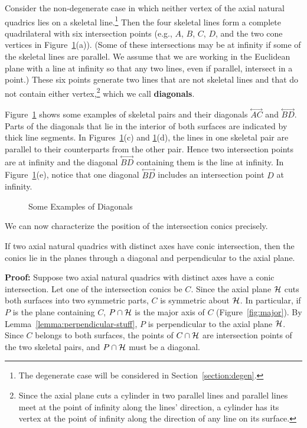 \begin{definition}
     Consider the non-degenerate case in which neither vertex of the axial
natural quadrics lies on a skeletal line.\footnote{The degenerate case will
     be considered in Section~\ref{section:degen}.}
Then the four skeletal lines
form a  complete quadrilateral with six intersection points
(e.g., $A$, $B$, $C$, $D$, and the two cone vertices in
Figure~\ref{fig:diagonals}(a)).
(Some of these intersections may be at infinity if some of the skeletal
lines are parallel.  We assume that we are working in the Euclidean plane
with a line at infinity
so that any two lines, even if parallel, intersect in a point.)
These six points generate two lines that are not skeletal lines
and that do not contain either vertex,\footnote{Since the axial plane
     cuts a cylinder in two parallel lines
     and parallel lines meet at the point of infinity along the lines'
     direction,
     a cylinder has its vertex at the point of infinity along the
     direction of any line on its surface.}
which we call {\bf diagonals}.
\end{definition}

\begin{example}
Figure~\ref{fig:diagonals} shows some examples of
skeletal pairs and their diagonals $\stackrel{\longleftrightarrow}{AC}$
and $\stackrel{\longleftrightarrow}{BD}$.
Parts of the diagonals that lie in the
interior of both surfaces are indicated by thick line segments.
In Figures~\ref{fig:diagonals}(c) and \ref{fig:diagonals}(d),
the lines in one skeletal pair are
parallel to their counterparts from the other pair.  Hence two intersection
points are at infinity and the diagonal $\stackrel{\longleftrightarrow}{BD}$
containing them is the line at
infinity.  In Figure~\ref{fig:diagonals}(e), notice that one diagonal
$\stackrel{\longleftrightarrow}{BD}$ includes
an intersection point $D$ at infinity.
\end{example}

\begin{figure}
\vspace{9cm}
\caption{Some Examples of Diagonals}
\label{fig:diagonals}
\end{figure}

We can now characterize the position of the intersection conics precisely.

\begin{lemma}
\label{lemma:coincide-conic}
     If two axial natural quadrics with distinct axes have conic
intersection, then the conics lie in the planes through a diagonal and
perpendicular to the axial plane.
\end{lemma}
{\bf Proof:}
Suppose two axial natural quadrics with distinct axes have a conic
intersection.  Let one of the intersection conics be $C$.  Since the axial
plane ${\cal H}$ cuts both surfaces into two symmetric parts, $C$ is
symmetric about ${\cal H}$.  In particular, if $P$ is the plane containing $C$,
$P\cap{\cal H}$ is the major axis of $C$ (Figure~\ref{fig:major}).
By Lemma~\ref{lemma:perpendicular-stuff}, $P$ is
perpendicular to the axial plane ${\cal H}$.  Since $C$ belongs to both
surfaces, the points of $C\cap {\cal H}$ are intersection points of the two
skeletal pairs, and $P\cap{\cal H}$ must be a diagonal. \QED

